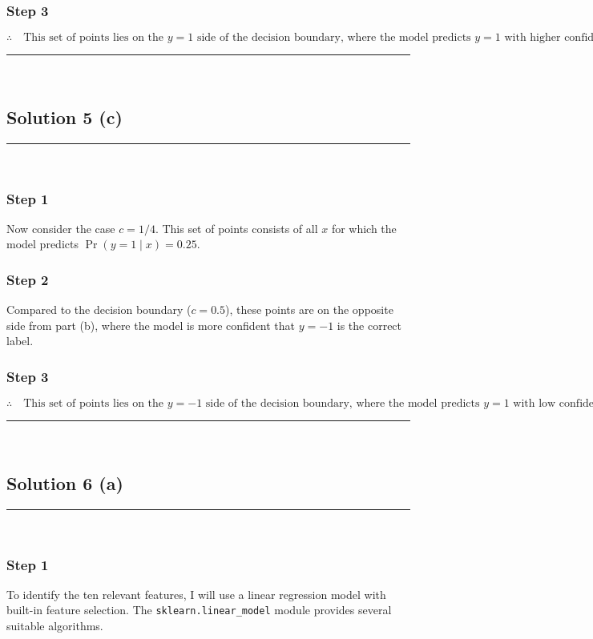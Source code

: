 \documentclass{article}
\begin{document}
\subsubsection*{Step 3}
\parbox{\textwidth}{
\[
\therefore \quad \text{This set of points lies on the $y=1$ side of the decision boundary, where the model predicts $y=1$ with higher confidence.}
\]
}

\noindent\rule{\textwidth}{0.4pt}\\

\newpage

\subsection*{Solution 5 (c)}
\noindent\rule{\textwidth}{0.4pt}\\

\subsubsection*{Step 1}
\parbox{\textwidth}{
Now consider the case $c = 1/4$. This set of points consists of all $x$ for which the model predicts $\operatorname{Pr}(y=1 \mid x) = 0.25$.
}

\subsubsection*{Step 2}
\parbox{\textwidth}{
Compared to the decision boundary ($c = 0.5$), these points are on the opposite side from part (b), where the model is more confident that $y=-1$ is the correct label.
}

\subsubsection*{Step 3}
\parbox{\textwidth}{
\[
\therefore \quad \text{This set of points lies on the $y=-1$ side of the decision boundary, where the model predicts $y=1$ with low confidence.}
\]
}

\noindent\rule{\textwidth}{0.4pt}\\

\newpage
\subsection*{Solution 6 (a)}
\noindent\rule{\textwidth}{0.4pt}\\

\subsubsection*{Step 1}
\parbox{\textwidth}{
To identify the ten relevant features, I will use a linear regression model with built-in feature selection. The \texttt{sklearn.linear\_model} module provides several suitable algorithms.
}
\end{document}
